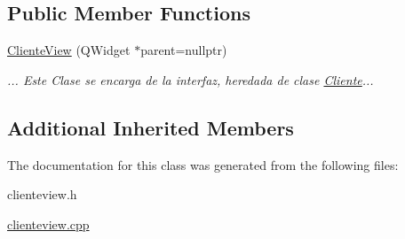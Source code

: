 \subsection*{Public Member Functions}
\begin{DoxyCompactItemize}
\item 
\mbox{\label{classClienteView_ab1362a221096c58d062d904c2c399059}} 
\mbox{\hyperlink{classClienteView_ab1362a221096c58d062d904c2c399059}{Cliente\+View}} (Q\+Widget $\ast$parent=nullptr)
\begin{DoxyCompactList}\small\item\em ... Este Clase se encarga de la interfaz, heredada de clase \mbox{\hyperlink{classCliente}{Cliente}}... \end{DoxyCompactList}\end{DoxyCompactItemize}
\subsection*{Additional Inherited Members}


The documentation for this class was generated from the following files\+:\begin{DoxyCompactItemize}
\item 
clienteview.\+h\item 
\mbox{\hyperlink{clienteview_8cpp}{clienteview.\+cpp}}\end{DoxyCompactItemize}
